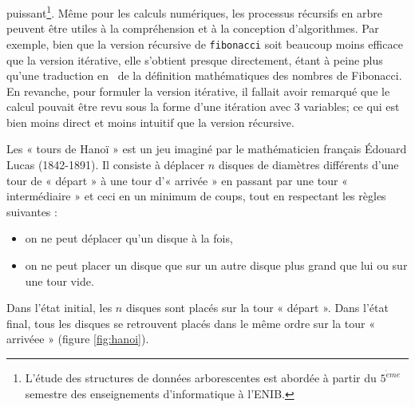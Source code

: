 puissant\footnote{L'étude des structures de données arborescentes 
est abordée à partir du $5^{\grave eme}$ semestre des enseignements
d'informatique à l'ENIB.}. 
Même pour les calculs numériques, les processus récursifs en arbre peuvent être utiles à la
compréhension et à la conception d'algorithmes. Par exemple, bien que la version
récursive de {\tt fibonacci} soit beaucoup moins efficace que la version
itérative, elle s'obtient presque directement, étant à peine plus qu'une
traduction en \python\ de la définition mathématiques des nombres de Fibonacci.
En revanche, pour formuler la version itérative, il fallait avoir remarqué 
que le calcul pouvait être revu sous la forme d'une itération avec 3 variables;
ce qui est bien moins direct et moins intuitif que la version récursive.

\begin{ex}\label{ex:hanoi}
Les « tours de Hanoï » est un jeu imaginé par le mathématicien 
français Édouard Lucas (1842-1891). Il 
consiste à déplacer $n$ disques de diamètres différents d'une 
tour de « départ » à une tour d'« arrivée » en passant par une 
tour « intermédiaire » et ceci en un minimum de coups, 
tout en respectant les règles suivantes :
\begin{itemize}
\item on ne peut déplacer qu'un disque à la fois,
\item on ne peut placer un disque que sur un autre disque 
	plus grand que lui ou sur une tour vide.
\end{itemize}
Dans l'état initial, les $n$ disques sont placés sur la tour
« départ ». Dans l'état final, tous les disques se retrouvent
placés dans le même ordre sur la tour « arrivéee » (figure \ref{fig:hanoi}).
{\em {}}
\end{ex}

